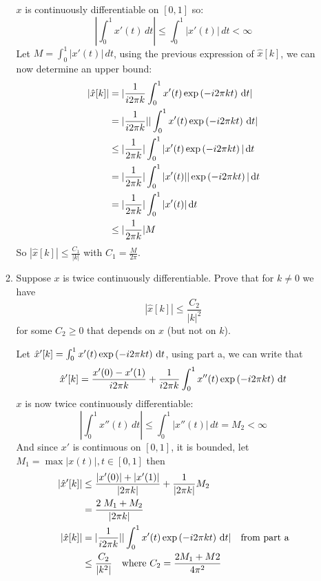 \documentclass[12pt,twoside]{article}
\begin{document}
\begin{enumerate}
\begin{enumerate}
    $x$ is continuously differentiable on $[0,1]$ so:
     $$\left|\int_0^1 x'(t)\,dt\right| \leq \int_0^1 |x'(t)|\,dt<\infty$$
     Let  $M=\int_0^1 |x'(t)|\,dt$, using the previous expression of $\hat{x}[k] $, we can now determine an upper bound:
     \begin{align*}
	   | \hat{x}[k]| 	&= |\frac{1}{i 2 \pi k} \int_0^1 x'(t) \exp \left( - i2 \pi k t \right)  \, \text{d}t| \\
	   			&= |\frac{1}{i 2 \pi k}| | \int_0^1 x'(t) \exp \left( - i2 \pi k t \right)  \, \text{d}t | \\
				&\le |\frac{1}{2 \pi k}|  \int_0^1 | x'(t) \exp \left( - i2 \pi k t \right)| \, \text{d}t  \\
				&= |\frac{1}{2 \pi k}|  \int_0^1 | x'(t)  |  |\exp \left( - i2 \pi k t \right)| \, \text{d}t  \\
				&=  |\frac{1}{2 \pi k}|  \int_0^1 | x'(t) |  \, \text{d}t  \\
				&\le  |\frac{1}{2 \pi k}| M\\
     \end{align*}
     So  $| \hat{x}[k]| \leq \frac{C_1}{|k|}$ with $C_1 = \frac{M}{2 \pi}$.
	         
  \item Suppose $x$ is twice continuously differentiable.
    Prove that for $k\neq 0$ we have
    $$|\hat{x}[k]| \leq \frac{C_2}{|k|^2}$$
    for some $C_2\geq0$ that depends on $x$ (but not on $k$).
    
    Let $ \hat{x}'[k] =  \int_0^1 x'(t) \exp \left( - i2 \pi k t \right)  \, \text{d}t$, using part a, we can write that
    $$\hat{x}'[k] =  \frac{x'(0) - x'(1)} {i 2 \pi k} + \frac{1}{i 2 \pi k} \int_0^1 x''(t) \exp \left( - i2 \pi k t \right)  \, \text{d}t$$ 
    $x$ is now twice continuously differentiable:
     $$\left|\int_0^1 x''(t)\,dt\right| \leq \int_0^1 |x''(t)|\,dt = M_2<\infty$$
     And since $x'$ is continuous on $[0,1]$, it is bounded, let $M_1 = \max|x(t)|, t \in [0,1]$ then
      \begin{align*}
	   | \hat{x}'[k]| 	&\le \frac{|x'(0) | +  |x'(1) |} {|2 \pi k|} +  \frac{1}{|2 \pi k|} M_2\\
	   			&= \frac{2 \; M_1 + M_2} {|2 \pi k|} \\
	  | \hat{x}[k]| 	&= |\frac{1}{i 2 \pi k}| | \int_0^1 x'(t) \exp \left( - i2 \pi k t \right)  \, \text{d}t| \text{ ~ from part a}\\
	  			&\le \frac{C_2} {|k^2|} \text{ ~ where } C_2 = \frac{2 M_1 + M2} {4 \pi^2}
        \end{align*}
    
  \end{enumerate}
  

\end{enumerate}
\end{document}
